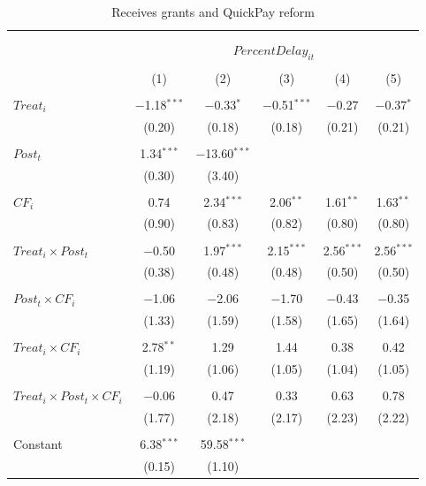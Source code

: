 \documentclass[
]{article}
\begin{document}
\begin{table}[H] \centering 
  \caption{Receives grants and QuickPay reform} 
  \label{} 
\small 
\begin{tabular}{@{\extracolsep{-2pt}}lccccc} 
\\[-1.8ex]\hline 
\hline \\[-1.8ex] 
\\[-1.8ex] & \multicolumn{5}{c}{$PercentDelay_{it}$  } \\ 
\\[-1.8ex] & (1) & (2) & (3) & (4) & (5)\\ 
\hline \\[-1.8ex] 
 $Treat_i$ & $-$1.18$^{***}$ & $-$0.33$^{*}$ & $-$0.51$^{***}$ & $-$0.27 & $-$0.37$^{*}$ \\ 
  & (0.20) & (0.18) & (0.18) & (0.21) & (0.21) \\ 
  & & & & & \\ 
 $Post_t$ & 1.34$^{***}$ & $-$13.60$^{***}$ &  &  &  \\ 
  & (0.30) & (3.40) &  &  &  \\ 
  & & & & & \\ 
 $CF_i$ & 0.74 & 2.34$^{***}$ & 2.06$^{**}$ & 1.61$^{**}$ & 1.63$^{**}$ \\ 
  & (0.90) & (0.83) & (0.82) & (0.80) & (0.80) \\ 
  & & & & & \\ 
 $Treat_i \times Post_t$ & $-$0.50 & 1.97$^{***}$ & 2.15$^{***}$ & 2.56$^{***}$ & 2.56$^{***}$ \\ 
  & (0.38) & (0.48) & (0.48) & (0.50) & (0.50) \\ 
  & & & & & \\ 
 $Post_t \times CF_i$ & $-$1.06 & $-$2.06 & $-$1.70 & $-$0.43 & $-$0.35 \\ 
  & (1.33) & (1.59) & (1.58) & (1.65) & (1.64) \\ 
  & & & & & \\ 
 $Treat_i \times CF_i$ & 2.78$^{**}$ & 1.29 & 1.44 & 0.38 & 0.42 \\ 
  & (1.19) & (1.06) & (1.05) & (1.04) & (1.05) \\ 
  & & & & & \\ 
 $Treat_i \times Post_t \times CF_i$ & $-$0.06 & 0.47 & 0.33 & 0.63 & 0.78 \\ 
  & (1.77) & (2.18) & (2.17) & (2.23) & (2.22) \\ 
  & & & & & \\ 
 Constant & 6.38$^{***}$ & 59.58$^{***}$ &  &  &  \\ 
  & (0.15) & (1.10) &  &  &  \\ 

\end{tabular}
\end{table}
\end{document}
